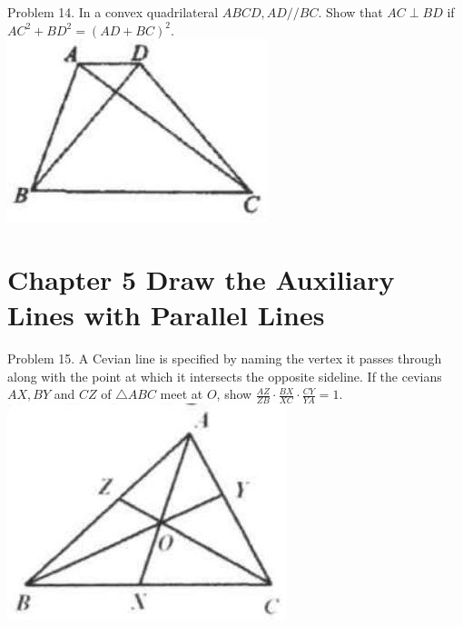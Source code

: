 \documentclass[10pt]{article}
\begin{document}
Problem 14. In a convex quadrilateral \(A B C D, A D / / B C\). Show that \(A C \perp B D\) if \(A C^{2}+B D^{2}=(A D+B C)^{2}\).\\
\includegraphics[max width=\textwidth, center]{2025_04_17_97bc1f7e44d93c271a88g-128(3)}

\section*{Chapter 5 Draw the Auxiliary Lines with Parallel Lines}
Problem 15. A Cevian line is specified by naming the vertex it passes through along with the point at which it intersects the opposite sideline. If the cevians \(A X, B Y\) and \(C Z\) of \(\triangle A B C\) meet at \(O\), show \(\frac{A Z}{Z B} \cdot \frac{B X}{X C} \cdot \frac{C Y}{Y A}=1\).\\
\includegraphics[max width=\textwidth, center]{2025_04_17_97bc1f7e44d93c271a88g-129}
\end{document}
